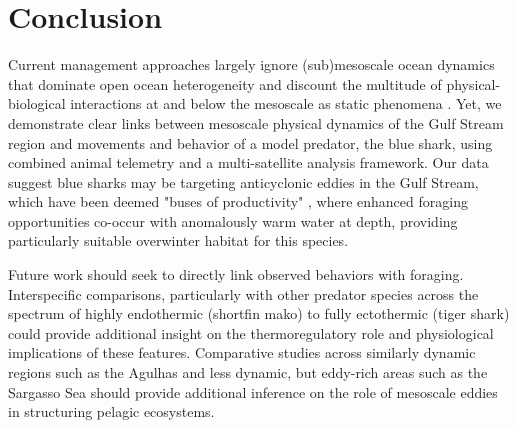 \section{Conclusion}

Current management approaches largely ignore (sub)mesoscale ocean dynamics that dominate open ocean heterogeneity and discount the multitude of physical-biological interactions at and below the mesoscale as static phenomena \citep{Maxwell2015, Lewison2015}. Yet, we demonstrate clear links between mesoscale physical dynamics of the Gulf Stream region and movements and behavior of a model predator, the blue shark, using combined animal telemetry and a multi-satellite analysis framework. Our data suggest blue sharks may be targeting anticyclonic eddies in the Gulf Stream, which have been deemed "buses of productivity" \citep{Fennell2015}, where enhanced foraging opportunities co-occur with anomalously warm water at depth, providing particularly suitable overwinter habitat for this species. 

Future work should seek to directly link observed behaviors with foraging. Interspecific comparisons, particularly with other predator species across the spectrum of highly endothermic (\eg shortfin mako) to fully ectothermic (\eg tiger shark) could provide additional insight on the thermoregulatory role and physiological implications of these features. Comparative studies across similarly dynamic regions such as the Agulhas and less dynamic, but eddy-rich areas such as the Sargasso Sea should provide additional inference on the role of mesoscale eddies in structuring pelagic ecosystems. 

